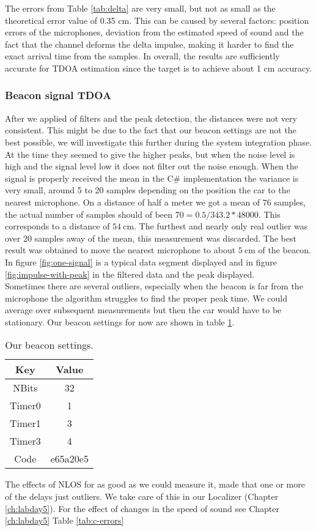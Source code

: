 \documentclass[final]{scrreprt} %
\begin{document}
The errors from Table \ref{tab:delta} are very small, but not as small as the theoretical error value of 0.35 cm.
This can be caused by several factors: position errors of the microphones, deviation from the estimated speed of sound and the fact that the channel deforms the delta impulse, making it harder to find the exact arrival time from the samples.
In overall, the results are sufficiently accurate for TDOA estimation since the target is to achieve about 1 cm accuracy.

\subsubsection{Beacon signal TDOA}
After we applied of filters and the peak detection, the distances were not very consistent.
This might be due to the fact that our beacon settings are not the best possible, we will investigate this further during the system integration phase.
At the time they seemed to give the higher peaks, but when the noise level is high and the signal level low it does not filter out the noise enough.
When the signal is properly received the mean in the C\# implementation the variance is very small, around 5 to 20 samples depending on the position the car to the nearest microphone.
On a distance of half a meter we got a mean of $76$ samples, the actual number of samples should of been $70 = 0.5/343.2*48000$.
This corresponds to a distance of $\SI{54}{\centi\meter}$.
The furthest and nearly only real outlier was over 20 samples away of the mean, this measurement was discarded.
The best result was obtained to move the nearest microphone to about $\SI{5}{\centi\meter}$ of the beacon.
In figure \ref{fig:one-signal} is a typical data segment displayed and in figure \ref{fig:impulse-with-peak} in the filtered data and the peak displayed.\\
Sometimes there are several outliers, especially when the beacon is far from the microphone the algorithm struggles to find the proper peak time.
We could average over subsequent measurements but then the car would have to be stationary.
Our beacon settings for now are shown in table \ref{tab:beacon-settings}.
\begin{table} [H]
	\centering
	\begin{tabular} { c | c }
	Key & Value \\ \hline
	NBits & 32 \\
	Timer0 & 1 \\
	Timer1 & 3 \\
	Timer3 & 4 \\
	Code & e65a20e5 \\	
	\end{tabular}
\caption{Our beacon settings.}
\label{tab:beacon-settings}
\end{table}
The effects of NLOS for as good as we could measure it, made that one or more of the delays just outliers.
We take care of this in our Localizer (Chapter \ref{ch:labday5}).
For the effect of changes in the speed of sound see Chapter \ref{ch:labday5} Table \ref{tab:c-errors}
\end{document}
